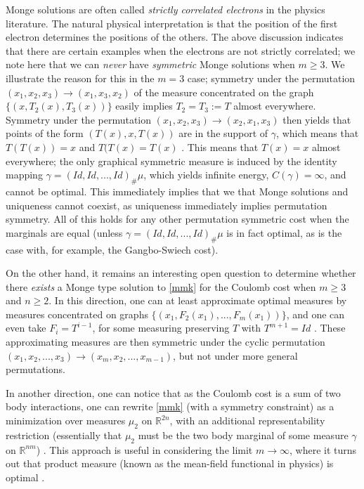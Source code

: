 \documentclass[letter,10pt]{article}
\theoremstyle{dotless}
\begin{document}
Monge solutions are often called \textit{strictly correlated electrons} in the physics literature.  The natural physical interpretation is that  the position of the first electron determines the positions of the others.  The above discussion indicates that there are certain examples when the electrons are not strictly correlated; we note here that we can \textit{never} have \textit{symmetric}  Monge solutions when $m \geq 3$.  We illustrate the reason for this in the $m=3$ case; symmetry under the permutation $(x_1,x_2,x_3) \rightarrow (x_1,x_3,x_2) $ of the measure concentrated on the graph $\{(x,T_2(x),T_3(x))\}$ easily implies $T_2 =T_3:=T$ almost everywhere.  Symmetry under the permutation  $(x_1,x_2,x_3) \rightarrow (x_2,x_1,x_3)$ then yields that points of the form $(T(x),x,T(x))$ are in the support of $\gamma$, which means that $T(T(x)) =x$  and $T(T(x)=T(x)$ .  This means that $T(x) =x$ almost everywhere; the only graphical symmetric measure is induced by the identity mapping $\gamma=(Id,Id,...,Id)_{\#}\mu$, which yields infinite energy, $C(\gamma) =\infty$, and cannot be optimal.  This immediately implies that we that Monge solutions and uniqueness cannot coexist, as uniqueness immediately implies permutation symmetry.  All of this holds for any other permutation symmetric cost when the marginals are equal (unless $\gamma=(Id,Id,...,Id)_{\#}\mu$ is in fact optimal, as is the case with, for example, the Gangbo-Swiech cost).

On the other hand, it remains an interesting open question to determine whether there \emph{exists} a Monge type solution to \eqref{mmk} for the Coulomb cost when $m \geq 3$ and $n \geq 2$.  In this direction,  one can at least approximate optimal measures by measures concentrated on graphs $\{(x_1,F_2(x_1),...,F_m(x_1))\}$, and one can even take $F_i =T^{i-1}$, for some measuring preserving $T$ with $T^{m+1} =Id$ \cite{cdm}.  These approximating measures are then symmetric under the cyclic permutation  $(x_1,x_2,...,x_3) \rightarrow (x_m,x_2,...,x_{m-1}) $, but not under more general permutations. 

In another direction, one can notice that as the Coulomb cost is a sum of two body interactions, one can rewrite \eqref{mmk} (with a symmetry constraint) as a minimization over measures $\mu_2$ on $\mathbb{R}^{2n}$, with an additional representability restriction (essentially that $\mu_2$ must be the two body marginal of some measure $\gamma$ on $\mathbb{R}^{nm}$) \cite{FMPCK}.  This approach is useful in considering the limit $m \rightarrow \infty$, where it turns out that product measure (known as the mean-field functional in physics) is optimal \cite{CFP}. 
\end{document}
